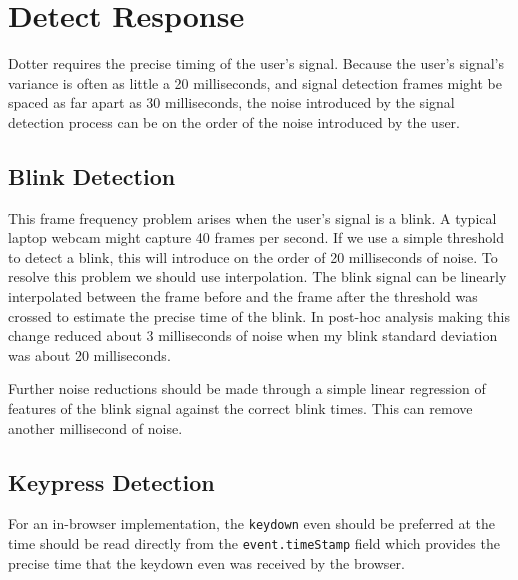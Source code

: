 \chapter{Detect Response}
\label{chap:detect-response}

Dotter requires the precise timing of the user's signal.
Because the user's signal's variance is often as little a 20 milliseconds,
and signal detection frames might be spaced as far apart as 30 milliseconds,
the noise introduced by the signal detection process can be on the order of the
noise introduced by the user.


\section{Blink Detection}
This frame frequency problem arises when the user's signal is a blink.
A typical laptop webcam might capture 40 frames per second.
If we use a simple threshold to detect a blink, this will introduce on the order of 20 milliseconds of noise.
To resolve this problem we should use interpolation.
The blink signal can be linearly interpolated between the frame before and the frame after the threshold was crossed
to estimate the precise time of the blink.
In post-hoc analysis making this change reduced about 3 milliseconds of noise when my blink standard deviation was about 20 milliseconds.

Further noise reductions should be made through a simple linear regression of features of the blink signal against
the correct blink times. This can remove another millisecond of noise.


\section{Keypress Detection}

For an in-browser implementation,
the \texttt{keydown} even should be preferred
at the time should be read directly from the 
\texttt{event.timeStamp} field which provides the precise
time that the keydown even was received by the browser.